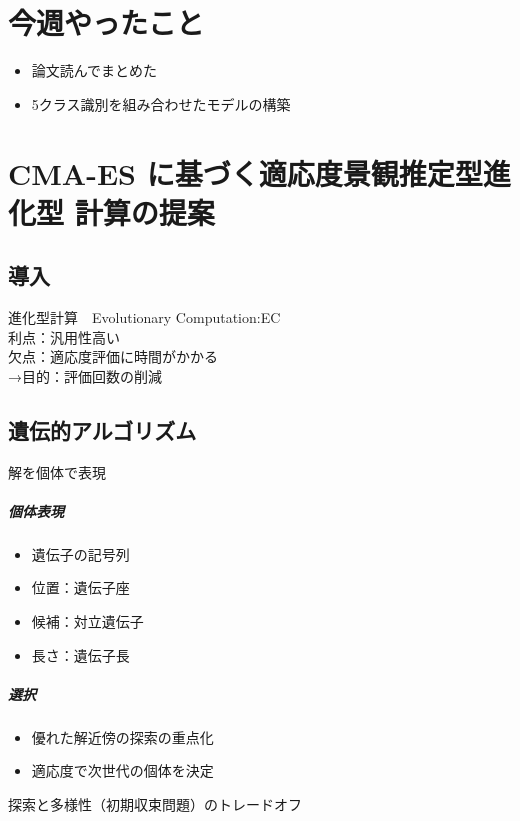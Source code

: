 \documentclass[twocolumn]{jarticle}     %
\begin{document}


\section{今週やったこと}
\begin{itemize}
	\item {論文読んでまとめた}
	\item {5クラス識別を組み合わせたモデルの構築}
\end{itemize}



\section{CMA-ES に基づく適応度景観推定型進化型
計算の提案}

\subsection{導入}
進化型計算　Evolutionary Computation:EC\\
利点：汎用性高い\\
欠点：適応度評価に時間がかかる\\
→目的：評価回数の削減

\subsection{遺伝的アルゴリズム}
解を個体で表現

\subparagraph{個体表現}
\begin{itemize}
  \item 遺伝子の記号列
  \item 位置：遺伝子座
  \item 候補：対立遺伝子
  \item 長さ：遺伝子長
\end{itemize}

\subparagraph{選択}
\begin{itemize}
  \item 優れた解近傍の探索の重点化
  \item 適応度で次世代の個体を決定
\end{itemize}
探索と多様性（初期収束問題）のトレードオフ
\end{document}
